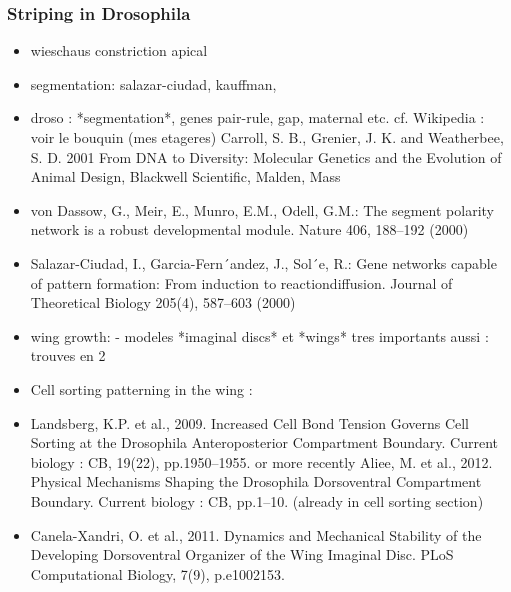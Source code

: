 \subsubsection{Striping in Drosophila}
\begin{itemize}
	\item wieschaus constriction apical
	\item segmentation: salazar-ciudad, kauffman, 
	\item droso : *segmentation*, genes pair-rule, gap, maternal etc. cf. Wikipedia : voir le bouquin  (mes etageres) Carroll, S. B., Grenier, J. K. and Weatherbee, S. D. 2001 From DNA to Diversity: Molecular Genetics and the Evolution of Animal Design, Blackwell Scientific, Malden, Mass
	\item von Dassow, G., Meir, E., Munro, E.M., Odell, G.M.: The segment polarity network is a robust developmental module. Nature 406, 188–192 (2000) \cite{vonDassow:2000kx}
	\item Salazar-Ciudad, I., Garcia-Fern´andez, J., Sol´e, R.: Gene networks capable of pattern formation: From induction to reactiondiffusion. Journal of Theoretical Biology 205(4), 587–603 (2000) \cite{SalazarCiudad:2000up}
	\item wing growth: - modeles *imaginal discs* et *wings* tres importants aussi : trouves en 2
	\item Cell sorting patterning in the wing : 
	\item Landsberg, K.P. et al., 2009. Increased Cell Bond Tension Governs Cell Sorting at the Drosophila Anteroposterior Compartment Boundary. Current biology : CB, 19(22), pp.1950–1955. \cite{Landsberg:2009bp} or more recently Aliee, M. et al., 2012. Physical Mechanisms Shaping the Drosophila Dorsoventral Compartment Boundary. Current biology : CB, pp.1–10. \cite{Aliee:2012ek} (already in cell sorting section)
	\item    Canela-Xandri, O. et al., 2011. Dynamics and Mechanical Stability of the Developing Dorsoventral Organizer of the Wing Imaginal Disc. PLoS Computational Biology, 7(9), p.e1002153. \cite{CanelaXandri:2011kl}
\end{itemize}

